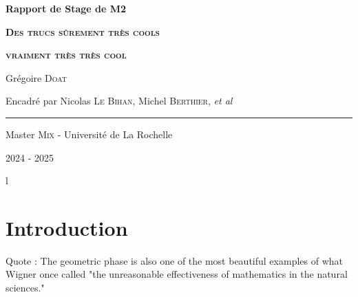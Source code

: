 \documentclass[hidelinks, french, oneside]{article}
\newcommand{\etal}{\textit{et al}}
\theoremstyle{enonce}
\theoremstyle{special}
\theoremstyle{rqlike}
\theoremstyle{exo}
\theoremstyle{demo}
\begin{document}
\begin{titlepage}
	
	\centering
	\vspace{1.5cm}
	{\huge\textbf{Rapport de Stage de M2}}\par
	
	\vspace{2cm}
	{\huge\textbf{\textsc{Des trucs sûrement très cools}}}\par 
	\vspace{0.5cm}
	
	{\huge\textbf{\textsc{vraiment très très cool}}}\par
	\vspace{2.0cm}
	
	{\large Grégoire \textsc{Doat}}\par
	\vspace{0.5cm}
	\vfill
	
	{\large Encadré par Nicolas \textsc{Le Bihan},  Michel \textsc{Berthier}, \etal}\par
	\vspace{0.5cm}
	
	\rule{10cm}{0.4pt}\par
	\vspace{0.7cm}
	
	{Master \textsc{Mix} - Université de La Rochelle}\par
	\vspace{0.25cm}
	
	{\large 2024 - 2025}
\end{titlepage}

\newpage
\tableofcontents
\thispagestyle{empty}
{\color{white}l}


\newpage
\setcounter{page}{1}

{}
\section*{Introduction}

Quote : The geometric phase is also one of the most beautiful examples of what Wigner once called "the unreasonable effectiveness of mathematics in the natural sciences." \cite[p. 4]{bohm_geometric_2003}
\end{document}
